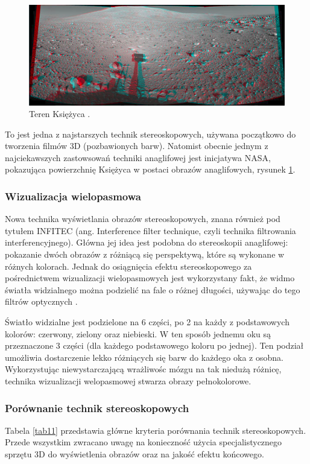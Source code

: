 \begin{figure}[H]
		\centering
 		\includegraphics[width=12.5cm]{NASA.png}
    	\caption{Teren Księżyca \cite{anaglif}.}
 		\label{rys4}
\end{figure}

To jest jedna z najstarszych technik stereoskopowych, używana początkowo do tworzenia filmów 3D (pozbawionych barw). Natomist obecnie jednym z najciekawszych zastowsowań techniki anaglifowej jest inicjatywa NASA, pokazująca powierzchnię Księżyca w postaci obrazów anaglifowych, rysunek \ref{rys4}. 

\subsubsection{Wizualizacja wielopasmowa}
Nowa technika wyświetlania obrazów stereoskopowych, znana również pod tytułem INFITEC (ang. Interference filter technique, czyli technika filtrowania interferencyjnego). Główna jej idea jest podobna do stereoskopii anaglifowej: pokazanie dwóch obrazów z różniącą się perspektywą, które są wykonane w różnych kolorach. Jednak do osiągnięcia efektu stereoskopowego za pośrednictwem wizualizacji wielopasmowych jest wykorzystany fakt, że widmo światła widzialnego można podzielić na fale o różnej długości, używając do tego filtrów optycznych \cite{infitec}.

Światło widzialne jest podzielone na 6 części, po 2 na każdy z podstawowych kolorów: czerwony, zielony oraz niebieski. W ten sposób jednemu oku są przeznaczone 3 części (dla każdego podstawowego koloru po jednej). Ten podział umożliwia dostarczenie lekko różniących się barw do każdego oka z osobna. Wykorzystując niewystarczającą wrażliwośc mózgu na tak niedużą różnicę, technika wizualizacji welopasmowej stwarza obrazy pełnokolorowe.  

\subsubsection{Porównanie technik stereoskopowych}
Tabela \ref{tab11} przedstawia główne kryteria porównania technik stereoskopowych. Przede wszystkim zwracano uwagę na konieczność użycia  specjalistycznego sprzętu 3D do wyświetlenia obrazów oraz na jakość efektu końcowego. 

